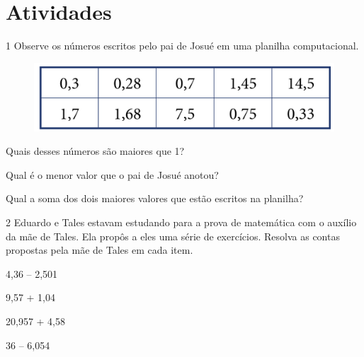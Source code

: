 \pagebreak
\section{Atividades}

\num{1} Observe os números escritos pelo pai de Josué em uma planilha computacional.

\begin{figure}[htpb!]
\centering
\includegraphics[width=.6\textwidth]{../ilustracoes/MAT5/SAEB_5ANO_MAT_figura86.png}
\end{figure}

\begin{escolha}
\item
  Quais desses números são maiores que 1?


\item
  Qual é o menor valor que o pai de Josué anotou?


\item
  Qual a soma dos dois maiores valores que estão escritos na planilha?

\end{escolha}


\num{2} Eduardo e Tales estavam estudando para a prova de matemática com o
auxílio da mãe de Tales. Ela propôs a eles uma série de exercícios.
Resolva as contas propostas pela mãe de Tales em cada item.

\begin{escolha}
\item
  4,36 – 2,501

\bigskip

\item
  9,57 + 1,04

\bigskip

\item
  20,957 + 4,58

\bigskip

\item
  36 – 6,054

\bigskip
\end{escolha}

